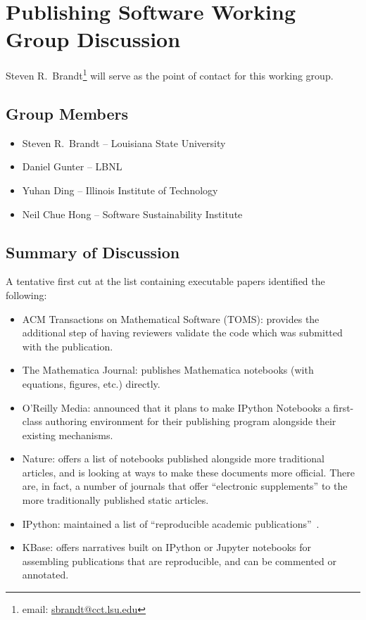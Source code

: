 \section{Publishing Software Working Group Discussion}
\label{sec:appendix_publishing_SW}

Steven R.\ Brandt\footnote{email:
\href{mailto:sbrandt@cct.lsu.edu}{sbrandt@cct.lsu.edu}} will serve as the point
of contact for this working group.

\subsection{Group Members}

\begin{itemize}
\item Steven R.\ Brandt -- Louisiana State University
\item Daniel Gunter -- LBNL
\item Yuhan Ding -- Illinois Institute of Technology
\item Neil Chue Hong -- Software Sustainability Institute
\end{itemize}

\subsection{Summary of Discussion}

A tentative first cut at the list containing executable papers identified the following:
\begin{itemize}

\item ACM Transactions on Mathematical Software (TOMS): provides the additional step
of having reviewers validate the code which was submitted with the publication.
 
\item The Mathematica Journal: publishes Mathematica notebooks (with equations,
figures, etc.) directly.

\item O'Reilly Media: announced that it plans to make IPython Notebooks a
first-class authoring environment for their publishing program alongside their
existing mechanisms.

\item Nature: offers a list of notebooks published alongside more traditional
articles, and is looking at ways to make these documents more official. There
are, in fact, a number of journals that offer ``electronic supplements'' to the
more traditionally published static articles.

\item IPython: maintained a list of ``reproducible academic
publications''~\cite{ipython-pubs}.

\item KBase: offers narratives built on IPython or Jupyter notebooks for assembling
publications that are reproducible, and can be commented or annotated.
  
\end{itemize}

